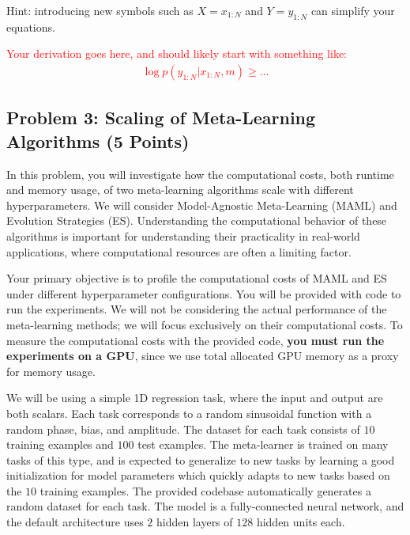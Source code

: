 \documentclass[12pt]{article}
\begin{document}
{ \color{gray}
Hint: introducing new symbols such as $X=x_{1:N}$ and $Y=y_{1:N}$ can simplify your equations.
}

\textcolor{red}{
Your derivation goes here, and should likely start with something like:
\begin{align}
  \log p(y_{1:N} | x_{1:N}, m) \geq \ldots
\end{align}
}


\subsection*{Problem 3: Scaling of Meta-Learning Algorithms (5 Points)}
In this problem, you will investigate how the computational costs, both runtime and memory usage, of two meta-learning algorithms scale with different hyperparameters.
We will consider Model-Agnostic Meta-Learning (MAML) and Evolution Strategies (ES).
Understanding the computational behavior of these algorithms is important for understanding their practicality in real-world applications, where computational resources are often a limiting factor.

Your primary objective is to profile the computational costs of MAML and ES under different hyperparameter configurations.
You will be provided with code to run the experiments.
We will not be considering the actual performance of the meta-learning methods; we will focus exclusively on their computational costs.
To measure the computational costs with the provided code, \textbf{you must run the experiments on a GPU}, since we use total allocated GPU memory as a proxy for memory usage.

We will be using a simple 1D regression task, where the input and output are both scalars.
Each task corresponds to a random sinusoidal function with a random phase, bias, and amplitude.
The dataset for each task consists of $10$ training examples and $100$ test examples.
The meta-learner is trained on many tasks of this type, and is expected to generalize to new tasks by learning a good initialization for model parameters which quickly adapts to new tasks based on the $10$ training examples.
The provided codebase automatically generates a random dataset for each task.
The model is a fully-connected neural network, and the default architecture uses $2$ hidden layers of $128$ hidden units each.

\newcommand{\dataset}{\mathcal{D}}
\newcommand{\task}{\mathcal{T}}
\newcommand{\supportdata}{\mathcal{D}^\mathrm{tr}}
\newcommand{\querydata}{\mathcal{D}^\mathrm{ts}}
\newcommand{\support}[1]{{#1}^\mathrm{tr}}
\newcommand{\query}[1]{{#1}^\mathrm{ts}}
\end{document}
